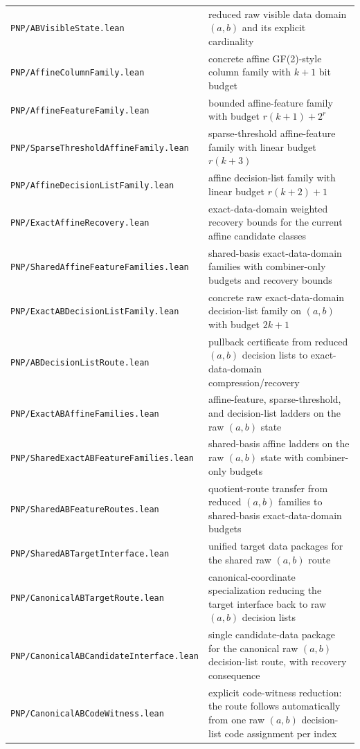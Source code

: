\documentclass[11pt]{article}
\theoremstyle{remark}
\begin{document}
\begin{center}
\begin{tabular}{ll}
\texttt{PNP/ABVisibleState.lean} & reduced raw visible data domain $(a,b)$ and its explicit cardinality \\
\texttt{PNP/AffineColumnFamily.lean} & concrete affine GF(2)-style column family with $k+1$ bit budget \\
\texttt{PNP/AffineFeatureFamily.lean} & bounded affine-feature family with budget $r(k+1)+2^r$ \\
\texttt{PNP/SparseThresholdAffineFamily.lean} & sparse-threshold affine-feature family with linear budget $r(k+3)$ \\
\texttt{PNP/AffineDecisionListFamily.lean} & affine decision-list family with linear budget $r(k+2)+1$ \\
\texttt{PNP/ExactAffineRecovery.lean} & exact-data-domain weighted recovery bounds for the current affine candidate classes \\
\texttt{PNP/SharedAffineFeatureFamilies.lean} & shared-basis exact-data-domain families with combiner-only budgets and recovery bounds \\
\texttt{PNP/ExactABDecisionListFamily.lean} & concrete raw exact-data-domain decision-list family on $(a,b)$ with budget $2k+1$ \\
\texttt{PNP/ABDecisionListRoute.lean} & pullback certificate from reduced $(a,b)$ decision lists to exact-data-domain compression/recovery \\
\texttt{PNP/ExactABAffineFamilies.lean} & affine-feature, sparse-threshold, and decision-list ladders on the raw $(a,b)$ state \\
\texttt{PNP/SharedExactABFeatureFamilies.lean} & shared-basis affine ladders on the raw $(a,b)$ state with combiner-only budgets \\
\texttt{PNP/SharedABFeatureRoutes.lean} & quotient-route transfer from reduced $(a,b)$ families to shared-basis exact-data-domain budgets \\
\texttt{PNP/SharedABTargetInterface.lean} & unified target data packages for the shared raw $(a,b)$ route \\
\texttt{PNP/CanonicalABTargetRoute.lean} & canonical-coordinate specialization reducing the target interface back to raw $(a,b)$ decision lists \\
\texttt{PNP/CanonicalABCandidateInterface.lean} & single candidate-data package for the canonical raw $(a,b)$ decision-list route, with recovery consequence \\
\texttt{PNP/CanonicalABCodeWitness.lean} & explicit code-witness reduction: the route follows automatically from one raw $(a,b)$ decision-list code assignment per index \\

\end{tabular}
\end{center}
\end{document}
